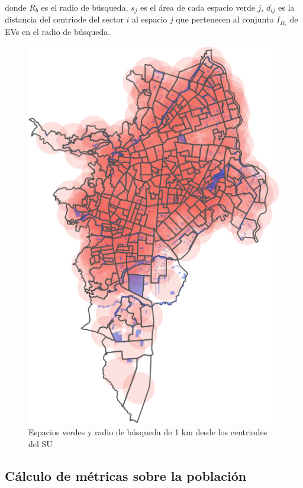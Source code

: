 \documentclass[12pt,a4paper,openany]{book}
\theoremstyle{definition}
\theoremstyle{definition}
\theoremstyle{definition}
\theoremstyle{remark}
\begin{document}
donde \(R_b\) es el radio de búsqueda, \(s_j\) es el área de cada
espacio verde \(j\), \(d_{ij}\) es la distancia del centriode del sector
\(i\) al espacio \(j\) que pertenecen al conjunto \(I_{R_b}\) de EVs en
el radio de búsqueda.

\begin{figure}

{\centering \includegraphics[width=1\linewidth]{tesis-unigis_files/figure-latex/mapa-rango1km-1} 

}

\caption{Espacios verdes y radio de búsqueda de 1 km desde los centriodes del SU}\label{fig:mapa-rango1km}
\end{figure}

\subsection{Cálculo de métricas sobre la
población}\label{calculo-de-metricas-sobre-la-poblacion}
\end{document}
